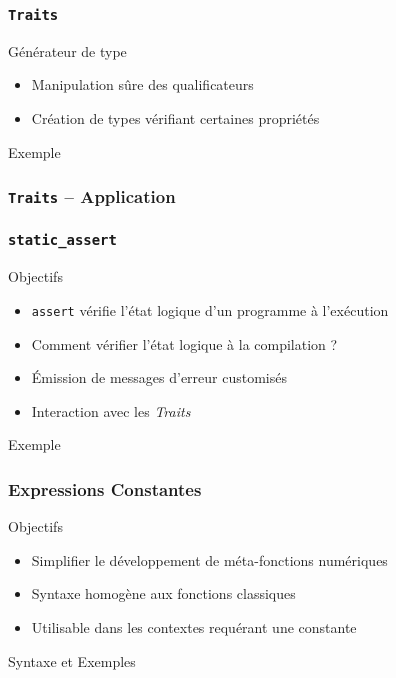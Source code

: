 \documentclass[svgnames]{beamer}
\begin{document}
\frame
{
  \frametitle{\texttt{Traits}}

  \begin{block}{Générateur de type}
  \begin{itemize}
  \item Manipulation sûre des qualificateurs
  \item Création de types vérifiant certaines propriétés
  \end{itemize}
  \end{block}

  \begin{block}{Exemple}
  \medskip
  \end{block}
}

\frame
{
  \frametitle{\texttt{Traits} -- Application}
}

\frame
{
  \frametitle{\texttt{static\_assert}}

  \begin{block}{Objectifs}
  \begin{itemize}
  \item \texttt{assert} vérifie l'état logique d'un programme à l'exécution
  \item Comment vérifier l'état logique à la compilation ?
  \item Émission de messages d'erreur customisés
  \item Interaction avec les \textit{Traits}
  \end{itemize}
  \end{block}

  \begin{block}{Exemple}
  \medskip
  \end{block}
}

\frame
{
  \frametitle{Expressions Constantes}

  \begin{block}{Objectifs}
  \begin{itemize}
  \item Simplifier le développement de méta-fonctions numériques
  \item Syntaxe homogène aux fonctions classiques
  \item Utilisable dans les contextes requérant une constante
  \end{itemize}
  \end{block}

  \begin{block}{Syntaxe et Exemples}
  \begin{overlayarea}{\textwidth}{5cm}
  \end{overlayarea}
  \end{block}
}
\end{document}
